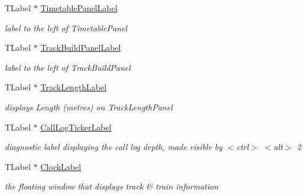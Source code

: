 \begin{DoxyCompactItemize}
\mbox{\label{class_t_interface_a321b10bd4ed20c62fa41fe6b950cb3b0}} 
T\+Label $\ast$ \mbox{\hyperlink{class_t_interface_a321b10bd4ed20c62fa41fe6b950cb3b0}{Timetable\+Panel\+Label}}
\begin{DoxyCompactList}\small\item\em label to the left of Timetable\+Panel \end{DoxyCompactList}\item 
\mbox{\label{class_t_interface_afbeb8c812aebd7b45f09b09889281a4c}} 
T\+Label $\ast$ \mbox{\hyperlink{class_t_interface_afbeb8c812aebd7b45f09b09889281a4c}{Track\+Build\+Panel\+Label}}
\begin{DoxyCompactList}\small\item\em label to the left of Track\+Build\+Panel \end{DoxyCompactList}\item 
\mbox{\label{class_t_interface_abf62cb5692bcccbba65b85dd6b192f16}} 
T\+Label $\ast$ \mbox{\hyperlink{class_t_interface_abf62cb5692bcccbba65b85dd6b192f16}{Track\+Length\+Label}}
\begin{DoxyCompactList}\small\item\em displays \textquotesingle{}Length (metres)\textquotesingle{} on Track\+Length\+Panel \end{DoxyCompactList}\item 
\mbox{\label{class_t_interface_a6c42fa668ecb3a9e4f8ddeb677781b84}} 
T\+Label $\ast$ \mbox{\hyperlink{class_t_interface_a6c42fa668ecb3a9e4f8ddeb677781b84}{Call\+Log\+Ticker\+Label}}
\begin{DoxyCompactList}\small\item\em diagnostic label displaying the call log depth, made visible by $<$ctrl$>$ $<$alt$>$ \textquotesingle{}2\textquotesingle{} \end{DoxyCompactList}\item 
\mbox{\label{class_t_interface_af06ebc1f5417120c44b3474e2eb1ea51}} 
T\+Label $\ast$ \mbox{\hyperlink{class_t_interface_af06ebc1f5417120c44b3474e2eb1ea51}{Clock\+Label}}
\begin{DoxyCompactList}\small\item\em the floating window that displays track \& train information \end{DoxyCompactList}\item 

\end{DoxyCompactItemize}
